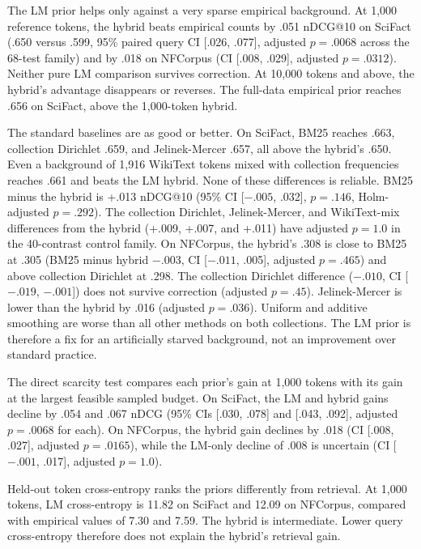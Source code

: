 \documentclass[11pt]{article}
\begin{document}
The LM prior helps only against a very sparse empirical background. At 1,000
reference tokens, the hybrid beats empirical counts by .051 nDCG@10 on SciFact
(.650 versus .599, 95\% paired query CI [.026, .077], adjusted $p=.0068$
across the 68-test family) and by .018 on NFCorpus (CI [.008, .029], adjusted
$p=.0312$). Neither pure LM comparison survives correction. At 10,000 tokens
and above, the hybrid's advantage disappears or reverses. The full-data
empirical prior reaches .656 on SciFact, above the 1,000-token hybrid.

The standard baselines are as good or better. On SciFact, BM25 reaches .663,
collection Dirichlet .659, and Jelinek-Mercer .657, all above the hybrid's
.650. Even a background of 1,916 WikiText tokens mixed with collection
frequencies reaches .661 and beats the LM hybrid. None of these differences is
reliable. BM25 minus the hybrid is +.013 nDCG@10 (95\% CI [$-.005$, .032],
$p=.146$, Holm-adjusted $p=.292$). The collection Dirichlet, Jelinek-Mercer,
and WikiText-mix differences from the hybrid (+.009, +.007, and +.011) have
adjusted $p=1.0$ in the 40-contrast control family. On NFCorpus, the hybrid's
.308 is close to BM25 at .305 (BM25 minus hybrid $-.003$, CI [$-.011$, .005],
adjusted $p=.465$) and above collection Dirichlet at .298. The collection Dirichlet difference ($-.010$,
CI [$-.019$, $-.001$]) does not survive correction (adjusted $p=.45$).
Jelinek-Mercer is lower than the hybrid by .016 (adjusted $p=.036$). Uniform
and additive smoothing are worse than all other methods on both collections.
The LM prior is therefore a fix for an artificially starved background, not
an improvement over standard practice.

The direct scarcity test compares each prior's gain at 1,000 tokens with its
gain at the largest feasible sampled budget. On SciFact, the LM and hybrid
gains decline by .054 and .067 nDCG (95\% CIs [.030, .078] and [.043, .092],
adjusted $p=.0068$ for each). On NFCorpus, the hybrid gain declines by .018
(CI [.008, .027], adjusted $p=.0165$), while the LM-only decline of .008 is
uncertain (CI [$-.001$, .017], adjusted $p=1.0$).

Held-out token cross-entropy ranks the priors differently from retrieval. At
1,000 tokens, LM cross-entropy is 11.82 on SciFact and 12.09 on NFCorpus,
compared with empirical values of 7.30 and 7.59. The hybrid is intermediate.
Lower query cross-entropy therefore does not explain the hybrid's retrieval
gain.
\end{document}
